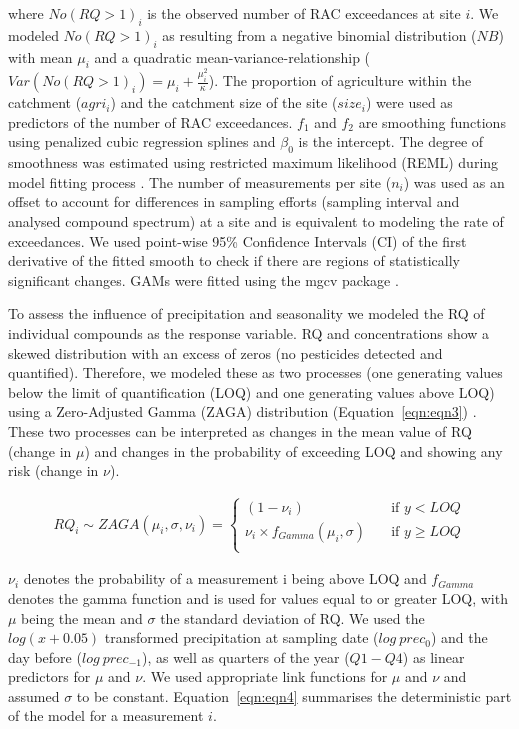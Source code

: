 \documentclass[journal=esthag,manuscript=article]{achemso}
\begin{document}
where $No(RQ > 1)_i$ is the observed number of RAC exceedances at site $i$. 
We modeled $No(RQ > 1)_i$ as resulting from a negative binomial distribution ($NB$) with mean $\mu_i$ and a quadratic mean-variance-relationship ($Var(No(RQ > 1)_i) = \mu_i + \frac{\mu_i^2}{\kappa}$).
The proportion of agriculture within the catchment ($agri_i$) and the catchment size of the site ($size_i$) were used as predictors of the number of RAC exceedances. 
$f_1$ and $f_2$ are smoothing functions using penalized cubic regression splines \citep{wood_generalized_2006} and $\beta_0$ is the intercept.
The degree of smoothness was estimated using restricted maximum likelihood (REML) during model fitting process \citep{wood_fast_2011}.
The number of measurements per site ($n_i$) was used as an offset to account for differences in sampling efforts (sampling interval and analysed compound spectrum) at a site and is equivalent to modeling the rate of exceedances. 
We used point-wise 95\% Confidence Intervals (CI) of the first derivative of the fitted smooth to check if there are regions of statistically significant changes.
GAMs were fitted using the mgcv package \citep{wood_fast_2011}.

To assess the influence of precipitation and seasonality we modeled the RQ of individual compounds as the response variable.
RQ and concentrations show a skewed distribution with an excess of zeros (no pesticides detected and quantified). 
Therefore, we modeled these as two processes (one generating values below the limit of quantification (LOQ) and one generating values above LOQ) using a Zero-Adjusted Gamma (ZAGA) distribution (Equation~\ref{eqn:eqn3}) \cite{rigby_generalized_2005,stasinopoulos_gamlss.dist:_2016}.
These two processes can be interpreted as changes in the mean value of RQ (change in $\mu$) and changes in the probability of exceeding LOQ and showing any risk (change in $\nu$).

\begin{align}
RQ_i \sim ZAGA(\mu_i, \sigma, \nu_i) = 
  \begin{cases}
    (1 - \nu_i)   & \quad  \text{if } y < LOQ \\
    \nu_i \times f_{Gamma} (\mu_i, \sigma) & \quad \text{if } y \ge LOQ \\
  \end{cases}
  \label{eqn:eqn3}
\end{align}

$\nu_i$ denotes the probability of a measurement i being above LOQ and $f_{Gamma}$ denotes the gamma function and is used for values equal to or greater LOQ, with $\mu$ being the mean and $\sigma$ the standard deviation of RQ.
We used the $log(x+0.05)$ transformed precipitation at sampling date ($log~prec_0$) and the day before ($log~prec_{-1}$), as well as quarters of the year ($Q1-Q4$) as linear predictors for $\mu$ and $\nu$. 
We used appropriate link functions for $\mu$ and $\nu$ and assumed $\sigma$ to be constant. 
Equation~\ref{eqn:eqn4} summarises the deterministic part of the model for a measurement $i$.
\end{document}
